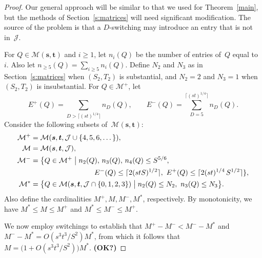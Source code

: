 \documentclass[12pt]{article}
\numberwithin{equation}{section}
\def\M{{\mathcal{M}}}
\def\J{{\mathcal{J}}}
\def\({\bigl(}   \def\){\bigr)}
\def\svec{{\boldsymbol{s}}}
\def\tvec{{\boldsymbol{t}}}
\def\Mst{{\M(\svec,\tvec)}}
\begin{document}
\begin{proof}
Our general approach will be similar to that we used for
Theorem~\ref{main}, but
the methods of Section~\ref{s:matrices} will need significant
modification.  The source of the problem is that a $D$-switching
may introduce an entry that is not in~$\J$.

For $Q\in\Mst$ and $i\ge 1$, let $n_i(Q)$ be the number of entries
of~$Q$ equal to~$i$.  Also let $n_{\ge5}(Q)=\sum_{i\ge5} n_i(Q)$.
Define $N_2$ and $N_3$ as in Section~\ref{s:matrices} when
$(S_2,T_2)$ is substantial, and $N_2=2$ and $N_3=1$ when
$(S_2,T_2)$ is insubstantial.
For $Q\in\M^+$, let
\[  E^+(Q) = \sum_{D > \lceil (st)^{1/4}\rceil} n_D(Q),\qquad
   E^-(Q) = \sum_{D=5}^{\lceil (st)^{1/4}\rceil} n_D(Q).
\]
Consider the following subsets of~$\Mst$:
\begin{align*}
  \M^+ &= \M(\svec,\tvec,\J\cup\{4,5,6,\ldots\,\}), \\
  \M &= \M(\svec,\tvec,\J), \\
  \M^- &= \bigl\{ Q\in\M^+ \bigm| n_2(Q),\, n_3(Q),\, n_4(Q)\leq S^{5/6},
       \\
     & \hspace*{3cm} 
   \,\, E^-(Q) \leq \lceil 2(stS)^{1/2}\rceil, \,\,
        E^+(Q) \leq \lceil 2(st)^{1/4}\, S^{1/2}\rceil\},\\
  \M^\ast &= \bigl\{ Q\in\M(\svec,\tvec,\J\cap\{0,1,2,3\}) \bigm| n_2(Q)\le
                          N_2,\,\, n_3(Q)\le N_3\bigr\}.
\end{align*}
Also define the cardinalities $M^+, M, M^-, M^\ast$, respectively.
By monotonicity, we have $M^\ast\le M\le M^+$ and
$M^\ast\le M^-\le M^+$.

We now employ switchings to establish that $M^+{-}M^-< M^-{-}M^\ast$
and $M^-{-}M^\ast =O(s^3t^3/S^2)M^\ast$, from which it follows that
$M=\(1+O(s^3t^3/S^2)\)M^\ast$. {\bf (OK?)}


\end{proof}
\end{document}
